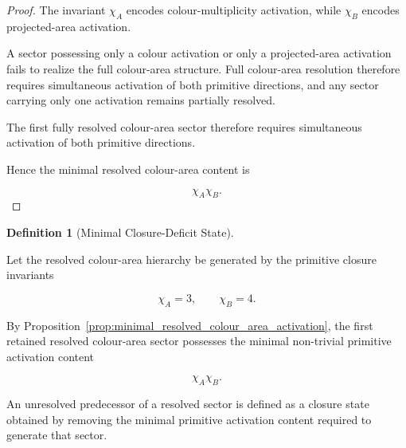 \documentclass[11pt]{article}
\theoremstyle{definition}
\newtheorem{definition}[theorem]{Definition}
\theoremstyle{remark}
\begin{document}
\begin{proof}

The invariant \(\chi_A\) encodes colour-multiplicity activation,
while \(\chi_B\) encodes projected-area activation.

A sector possessing only a colour activation or only a
projected-area activation fails to realize the full
colour-area structure. Full colour-area resolution therefore
requires simultaneous activation of both primitive directions,
and any sector carrying only one activation remains partially
resolved.

The first fully resolved colour-area sector therefore requires
simultaneous activation of both primitive directions.

Hence the minimal resolved colour-area content is

\begin{equation}
\chi_A\chi_B.
\end{equation}

\end{proof}

\begin{definition}[Minimal Closure-Deficit State]
\label{def:minimal_closure_deficit_state}

Let the resolved colour-area hierarchy be generated by the
primitive closure invariants

\begin{equation}
\chi_A=3,
\qquad
\chi_B=4.
\end{equation}

By Proposition~\ref{prop:minimal_resolved_colour_area_activation},
the first retained resolved colour-area sector possesses the
minimal non-trivial primitive activation content

\begin{equation}
\chi_A\chi_B.
\end{equation}

An unresolved predecessor of a resolved sector is defined as a
closure state obtained by removing the minimal primitive
activation content required to generate that sector.

\end{definition}
\end{document}
